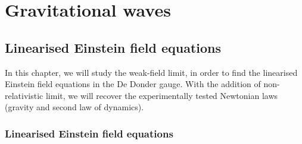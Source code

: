 \part{Gravitational waves}

\chapter{Linearised Einstein field equations}

    In this chapter, we will study the weak-field limit, in order to find the linearised Einstein field equations in the De Donder gauge. With the addition of non-relativistic limit, we will recover the experimentally tested Newtonian laws (gravity and second law of dynamics). 

\section{Linearised Einstein field equations}

